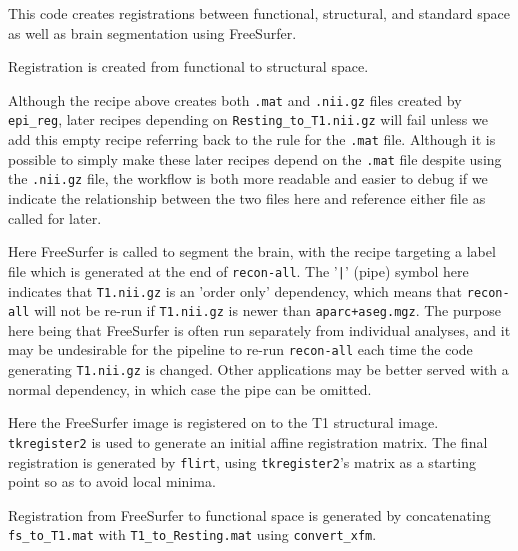 This code creates registrations between functional, structural, and standard space as well as brain segmentation using FreeSurfer.

Registration is created from functional to structural space.

Although the recipe above creates both \texttt{.mat} and \texttt{.nii.gz} files created by \texttt{epi_reg}, later recipes depending on \texttt{Resting_to_T1.nii.gz} will fail unless we add this empty recipe referring back to the rule for the \texttt{.mat} file. Although it is possible to simply make these later recipes depend on the \texttt{.mat} file despite using the \texttt{.nii.gz} file, the workflow is both more readable and easier to debug if we indicate the relationship between the two files here and reference either file as called for later.

Here FreeSurfer is called to segment the brain, with the recipe targeting a label file which is generated at the end of \texttt{recon-all}. The '\texttt{|}' (pipe) symbol here indicates that \texttt{T1.nii.gz}  is an 'order only' dependency, which means that \texttt{recon-all} will not be re-run if \texttt{T1.nii.gz} is newer than \texttt{aparc+aseg.mgz}. The purpose here being that FreeSurfer is often run separately from individual analyses, and it may be undesirable for the pipeline to re-run \texttt{recon-all} each time the code generating \texttt{T1.nii.gz} is changed. Other applications may be better served with a normal dependency, in which case the pipe can be omitted.

Here the FreeSurfer image is registered on to the T1 structural image. \texttt{tkregister2} is used to generate an initial affine registration matrix. The final registration is generated by \texttt{flirt}, using \texttt{tkregister2}'s matrix as a starting point so as to avoid local minima.

Registration from FreeSurfer to functional space is generated by concatenating \texttt{fs_to_T1.mat} with \texttt{T1_to_Resting.mat} using \texttt{convert_xfm}.

